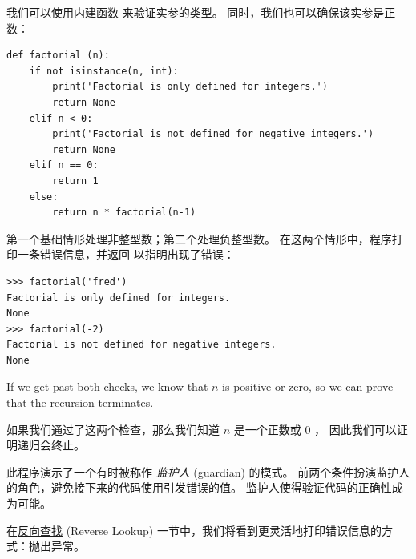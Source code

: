 我们可以使用内建函数  来验证实参的类型。 同时，我们也可以确保该实参是正数：
  

\begin{lstlisting}
def factorial (n):
    if not isinstance(n, int):
        print('Factorial is only defined for integers.')
        return None
    elif n < 0:
        print('Factorial is not defined for negative integers.')
        return None
    elif n == 0:
        return 1
    else:
        return n * factorial(n-1)
\end{lstlisting}

%

第一个基础情形处理非整型数；第二个处理负整型数。
在这两个情形中，程序打印一条错误信息，并返回  以指明出现了错误：


\begin{lstlisting}
>>> factorial('fred')
Factorial is only defined for integers.
None
>>> factorial(-2)
Factorial is not defined for negative integers.
None
\end{lstlisting}

%
If we get past both checks, we know that $n$ is positive or
zero, so we can prove that the recursion terminates.

如果我们通过了这两个检查，那么我们知道 $n$ 是一个正数或 $0$ ， 因此我们可以证明递归会终止。
  


此程序演示了一个有时被称作 {\em 监护人} (guardian) 的模式。
前两个条件扮演监护人的角色，避免接下来的代码使用引发错误的值。
监护人使得验证代码的正确性成为可能。



在\hyperref[raise]{反向查找} (Reverse Lookup) 一节中，我们将看到更灵活地打印错误信息的方式：抛出异常。


